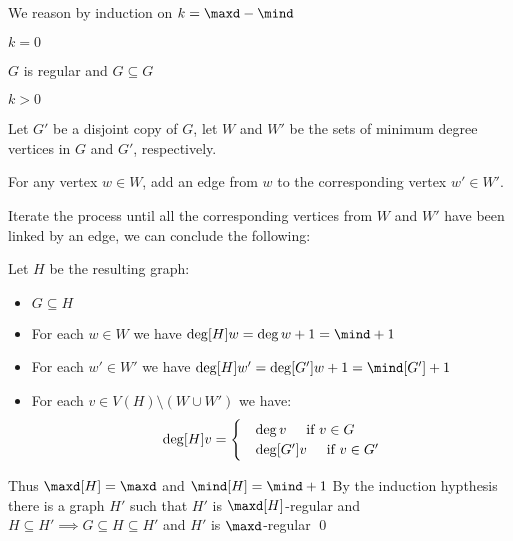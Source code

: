 \begin{prf}
    We reason by induction on $k = \maxd - \mind$

    \boldmath $k = 0$ \unboldmath

    $G$ is regular and $G \subseteq G$
    
    \boldmath $k > 0$ \unboldmath

    Let $G'$ be a disjoint copy of $G$, let $W$ and $W'$ be the sets of minimum degree vertices in $G$ and $G'$, respectively.

    For any vertex $w \in W$, add an edge from $w$ to the corresponding vertex $w' \in W'$.

    Iterate the process until all the corresponding vertices from $W$ and $W'$ have been linked by an edge, we can conclude the following:

    Let $H$ be the resulting graph:
    \begin{itemize}
        \item $G \subseteq H$
        \item For each $w \in W$ we have $\deg[H]{w} = \deg{w} + 1 = \mind + 1$
        \item For each $w' \in W'$ we have $\deg[H]{w'} = \deg[G']{w} + 1 = \mind[G'] + 1$
        \item For each $v \in V(H) \setminus (W \cup W')$ we have:
        \begin{equation*}
            \deg[H]{v} =
            \begin{cases}
                &\deg{v} \text{\hspace{5mm}if } v \in G\\
                &\deg[G']{v} \text{\hspace{5mm}if } v \in G'
            \end{cases}
        \end{equation*}
    \end{itemize}
    Thus $\maxd[H] = \maxd$ and $\mind[H] = \mind + 1$
    By the induction hypthesis there is a graph $H'$ such that $H'$ is $\maxd[H]$-regular and $H \subseteq H' \implies G \subseteq H \subseteq H'$ and $H'$ is $\maxd$-regular \qed
\end{prf}